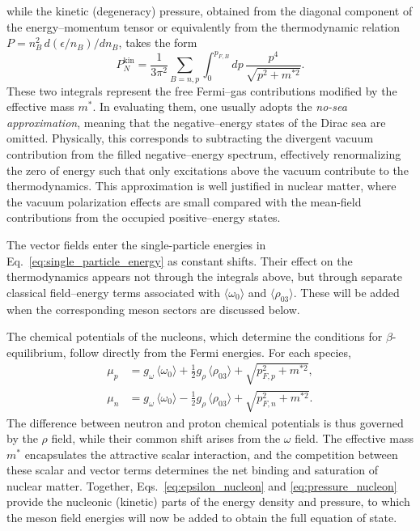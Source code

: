 while the kinetic (degeneracy) pressure, obtained from the diagonal component of the
energy–momentum tensor or equivalently from the thermodynamic relation
$P = n_B^{2}\,d(\epsilon/n_B)/dn_B$, takes the form
\begin{equation}
P_{N}^{\mathrm{kin}}
  = \frac{1}{3\pi^{2}}\sum_{B=n,p}
    \int_{0}^{p_{F,B}}\!dp\,\frac{p^{4}}{\sqrt{p^{2} + m^{*2}}}.
\label{eq:pressure_nucleon}
\end{equation}
These two integrals represent the free Fermi–gas contributions modified by the
effective mass $m^{*}$. In evaluating them, one usually adopts the
\emph{no-sea approximation}, meaning that the negative–energy states of the
Dirac sea are omitted. Physically, this corresponds to subtracting the divergent
vacuum contribution from the filled negative–energy spectrum, effectively
renormalizing the zero of energy such that only excitations above the vacuum
contribute to the thermodynamics. This approximation is well justified in
nuclear matter, where the vacuum polarization effects are small compared with
the mean-field contributions from the occupied positive–energy states.

The vector fields enter
the single-particle energies in Eq.~\eqref{eq:single_particle_energy} as constant
shifts. Their effect on the thermodynamics appears not through the integrals
above, but through separate classical field–energy terms associated with
$\langle\omega_0\rangle$ and $\langle\rho_{03}\rangle$. These will be added when the corresponding
meson sectors are discussed below.

The chemical potentials of the nucleons, which determine the conditions for
$\beta$-equilibrium, follow directly from the Fermi energies. For each species,
\begin{align}
\mu_p &= g_\omega\,\langle\omega_0\rangle + \tfrac{1}{2}g_\rho\,\langle\rho_{03}\rangle
         + \sqrt{p_{F,p}^{2} + m^{*2}},\\
\mu_n &= g_\omega\,\langle\omega_0\rangle - \tfrac{1}{2}g_\rho\,\langle\rho_{03}\rangle
         + \sqrt{p_{F,n}^{2} + m^{*2}}.
\end{align}
The difference between neutron and proton chemical potentials is thus governed
by the $\rho$ field, while their common shift arises from the $\omega$ field.
The effective mass $m^{*}$ encapsulates the attractive scalar interaction,
and the competition between these scalar and vector terms determines the net
binding and saturation of nuclear matter. Together, Eqs.~\eqref{eq:epsilon_nucleon}
and \eqref{eq:pressure_nucleon} provide the nucleonic (kinetic) parts of the
energy density and pressure, to which the meson field energies will now be
added to obtain the full equation of state.

